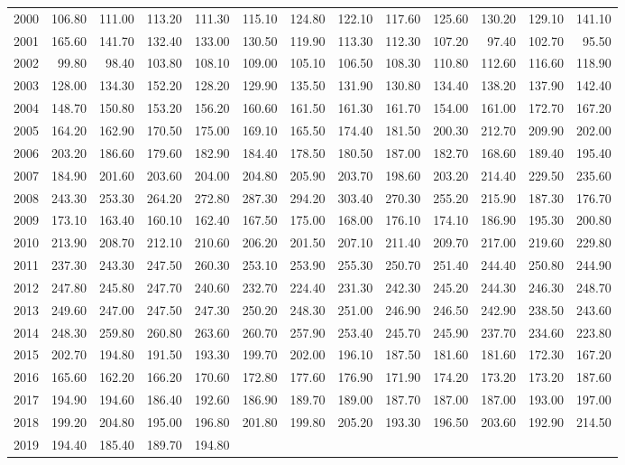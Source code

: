 \begin{longtable}{rrrrrrrrrrrrr}
  2000 & 106.80 & 111.00 & 113.20 & 111.30 & 115.10 & 124.80 & 122.10 & 117.60 & 125.60 & 130.20 & 129.10 & 141.10 \\ 
  2001 & 165.60 & 141.70 & 132.40 & 133.00 & 130.50 & 119.90 & 113.30 & 112.30 & 107.20 & 97.40 & 102.70 & 95.50 \\ 
  2002 & 99.80 & 98.40 & 103.80 & 108.10 & 109.00 & 105.10 & 106.50 & 108.30 & 110.80 & 112.60 & 116.60 & 118.90 \\ 
  2003 & 128.00 & 134.30 & 152.20 & 128.20 & 129.90 & 135.50 & 131.90 & 130.80 & 134.40 & 138.20 & 137.90 & 142.40 \\ 
  2004 & 148.70 & 150.80 & 153.20 & 156.20 & 160.60 & 161.50 & 161.30 & 161.70 & 154.00 & 161.00 & 172.70 & 167.20 \\ 
  2005 & 164.20 & 162.90 & 170.50 & 175.00 & 169.10 & 165.50 & 174.40 & 181.50 & 200.30 & 212.70 & 209.90 & 202.00 \\ 
  2006 & 203.20 & 186.60 & 179.60 & 182.90 & 184.40 & 178.50 & 180.50 & 187.00 & 182.70 & 168.60 & 189.40 & 195.40 \\ 
  2007 & 184.90 & 201.60 & 203.60 & 204.00 & 204.80 & 205.90 & 203.70 & 198.60 & 203.20 & 214.40 & 229.50 & 235.60 \\ 
  2008 & 243.30 & 253.30 & 264.20 & 272.80 & 287.30 & 294.20 & 303.40 & 270.30 & 255.20 & 215.90 & 187.30 & 176.70 \\ 
  2009 & 173.10 & 163.40 & 160.10 & 162.40 & 167.50 & 175.00 & 168.00 & 176.10 & 174.10 & 186.90 & 195.30 & 200.80 \\ 
  2010 & 213.90 & 208.70 & 212.10 & 210.60 & 206.20 & 201.50 & 207.10 & 211.40 & 209.70 & 217.00 & 219.60 & 229.80 \\ 
  2011 & 237.30 & 243.30 & 247.50 & 260.30 & 253.10 & 253.90 & 255.30 & 250.70 & 251.40 & 244.40 & 250.80 & 244.90 \\ 
  2012 & 247.80 & 245.80 & 247.70 & 240.60 & 232.70 & 224.40 & 231.30 & 242.30 & 245.20 & 244.30 & 246.30 & 248.70 \\ 
  2013 & 249.60 & 247.00 & 247.50 & 247.30 & 250.20 & 248.30 & 251.00 & 246.90 & 246.50 & 242.90 & 238.50 & 243.60 \\ 
  2014 & 248.30 & 259.80 & 260.80 & 263.60 & 260.70 & 257.90 & 253.40 & 245.70 & 245.90 & 237.70 & 234.60 & 223.80 \\ 
  2015 & 202.70 & 194.80 & 191.50 & 193.30 & 199.70 & 202.00 & 196.10 & 187.50 & 181.60 & 181.60 & 172.30 & 167.20 \\ 
  2016 & 165.60 & 162.20 & 166.20 & 170.60 & 172.80 & 177.60 & 176.90 & 171.90 & 174.20 & 173.20 & 173.20 & 187.60 \\ 
  2017 & 194.90 & 194.60 & 186.40 & 192.60 & 186.90 & 189.70 & 189.00 & 187.70 & 187.00 & 187.00 & 193.00 & 197.00 \\ 
  2018 & 199.20 & 204.80 & 195.00 & 196.80 & 201.80 & 199.80 & 205.20 & 193.30 & 196.50 & 203.60 & 192.90 & 214.50 \\ 
  2019 & 194.40 & 185.40 & 189.70 & 194.80 &  &  &  &  &  &  &  &  \\ 
   \hline
\hline
\end{longtable}
